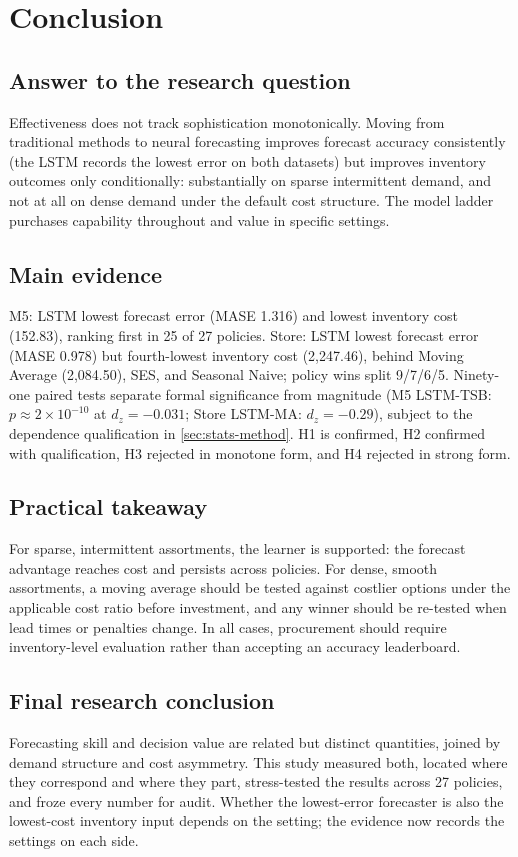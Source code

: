 \section{Conclusion}
\label{sec:conclusion}

\subsection{Answer to the research question}
\label{sec:answer}
Effectiveness does not track sophistication monotonically. Moving from
traditional methods to neural forecasting improves forecast accuracy
consistently (the LSTM records the lowest error on both datasets) but
improves inventory outcomes only conditionally: substantially on sparse
intermittent demand, and not at all on dense demand under the default cost
structure. The model ladder purchases capability throughout and value in
specific settings.

\subsection{Main evidence}
\label{sec:main-evidence}
M5: LSTM lowest forecast error (MASE 1.316) and lowest inventory cost
(152.83), ranking first in 25 of 27 policies. Store: LSTM lowest forecast
error (MASE 0.978) but fourth-lowest inventory cost (2,247.46), behind Moving
Average (2,084.50), SES, and Seasonal Naive; policy wins split 9/7/6/5.
Ninety-one paired tests separate formal significance from magnitude (M5
LSTM-TSB: $p\approx2\times 10^{-10}$ at $d_z=-0.031$; Store LSTM-MA:
$d_z=-0.29$), subject to the dependence qualification in
\cref{sec:stats-method}. H1 is confirmed, H2 confirmed with qualification, H3
rejected in monotone form, and H4 rejected in strong form.

\subsection{Practical takeaway}
\label{sec:takeaway}
For sparse, intermittent assortments, the learner is supported: the forecast
advantage reaches cost and persists across policies. For dense, smooth
assortments, a moving average should be tested against costlier options
under the applicable cost ratio before investment, and any winner should be
re-tested when lead times or penalties change. In all cases, procurement
should require inventory-level evaluation rather than accepting an accuracy
leaderboard.

\subsection{Final research conclusion}
\label{sec:final-word}
Forecasting skill and decision value are related but distinct quantities,
joined by demand structure and cost asymmetry. This study measured both,
located where they correspond and where they part, stress-tested the results
across 27 policies, and froze every number for audit. Whether the
lowest-error forecaster is also the lowest-cost inventory input depends on
the setting; the evidence now records the settings on each side.
